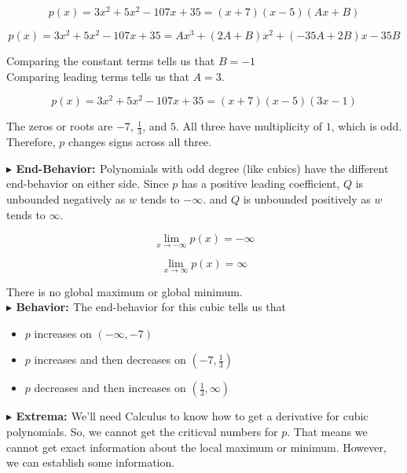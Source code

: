 \documentclass{ximera}
\begin{document}
\begin{exercise}
\[
p(x) = 3 x^2 + 5 x^2 - 107 x + 35 = (x+7)(x-5)(A x + B)
\]




\[
p(x) = 3 x^2 + 5 x^2 - 107 x + 35 = A x^3 + (2 A + B) x^2 + (-35 A + 2 B) x - 35 B 
\]


Comparing the constant terms tells us that $B = -1$ \\



Comparing leading terms tells us that $A = 3$.




\[
p(x) = 3 x^2 + 5 x^2 - 107 x + 35 = (x+7)(x-5)(3 x - 1)
\]





The zeros or roots are $-7$, $\frac{1}{3}$, and $5$.  All three have multiplicity of $1$, which is odd.  Therefore, $p$ changes signs across all three.










\textbf{\textcolor{blue!55!black}{$\blacktriangleright$ End-Behavior: }} Polynomials with odd degree (like cubics) have the different end-behavior on either side.  Since $p$ has a positive leading coefficient, $Q$ is unbounded negatively as $w$ tends to $-\infty$. and $Q$ is unbounded positively as $w$ tends to $\infty$.

\[
\lim\limits_{x \to -\infty} p(x) = -\infty
\]


\[
\lim\limits_{x \to \infty} p(x) = \infty
\]


There is no global maximum or global minimum. \\



\textbf{\textcolor{blue!55!black}{$\blacktriangleright$ Behavior: }}  The end-behavior for this cubic tells us that 



\begin{itemize}
\item $p$ increases on $(-\infty, -7)$ 
\item $p$ increases and then decreases on $\left( -7, \frac{1}{3} \right)$
\item $p$ decreases and then increases on $\left( \frac{1}{3}, \infty \right)$
\end{itemize}




\textbf{\textcolor{blue!55!black}{$\blacktriangleright$ Extrema: }}  We'll need Calculus to know how to get a derivative for cubic polynomials.  So, we cannot get the criticval numbers for $p$.  That means we cannot get exact information about the local maximum or minimum.  However, we can establish some information.






\end{exercise}
\end{document}
